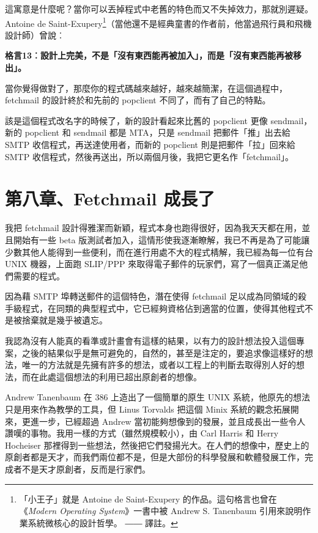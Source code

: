 \documentclass[12pt, a5paper]{book}
\begin{document}
這寓意是什麼呢？當你可以丟掉程式中老舊的特色而又不失掉效力，那就別遲疑。Antoine
de Saint-Exupery\footnote{「小王子」就是 Antoine de Saint-Exupery
  的作品。這句格言也曾在《\emph{Modern Operating System}》一書中被
  Andrew S. Tanenbaum 引用來說明作業系統微核心的設計哲學。 ―― 譯註。}（當他還不是經典童書的作者前，他當過飛行員和飛機設計師）曾說︰

\textbf{格言13︰設計上完美，不是「沒有東西能再被加入」，而是「沒有東西能再被移出」。}

當你覺得做對了，那麼你的程式碼越來越好，越來越簡潔，在這個過程中，fetchmail
的設計終於和先前的 popclient 不同了，而有了自己的特點。

該是這個程式改名字的時候了，新的設計看起來比舊的 popclient 更像
sendmail，新的 popclient 和 sendmail 都是 MTA，只是 sendmail
把郵件「推」出去給 SMTP 收信程式，再送達使用者，而新的 popclient
則是把郵件「拉」回來給 SMTP
收信程式，然後再送出，所以兩個月後，我把它更名作「fetchmail」。

\newpage
\section{第八章、Fetchmail
成長了}\label{ux7b2cux516bux7ae0fetchmail-ux6210ux9577ux4e86}

我把 fetchmail
設計得雅潔而新穎，程式本身也跑得很好，因為我天天都在用，並且開始有一些
beta
版測試者加入，這情形使我逐漸瞭解，我已不再是為了可能讓少數其他人能得到一些便利，而在進行用處不大的程式棈解，我已經為每一位有台
UNIX 機器，上面跑 SLIP/PPP
來取得電子郵件的玩家們，寫了一個真正滿足他們需要的程式。

因為藉 SMTP 埠轉送郵件的這個特色，潛在使得 fetchmail
足以成為同領域的殺手級程式，在同類的典型程式中，它已經夠資格佔到適當的位置，使得其他程式不是被捨棄就是幾乎被遺忘。

我認為沒有人能真的看準或計畫會有這樣的結果，以有力的設計想法投入這個專案，之後的結果似乎是無可避免的，自然的，甚至是注定的，要追求像這樣好的想法，唯一的方法就是先擁有許多的想法，或者以工程上的判斷去取得別人好的想法，而在此處這個想法的利用已超出原創者的想像。

Andrew Tanenbaum 在 386 上造出了一個簡單的原生 UNIX
系統，他原先的想法只是用來作為教學的工具，但 Linus Torvalds 把這個 Minix
系統的觀念拓展開來，更進一步，已經超過 Andrew
當初能夠想像到的發展，並且成長出一些令人讚嘆的事物。我用一樣的方式（雖然規模較小），由
Carl Harris 和 Herry Hocheiser
那裡得到一些想法，然後把它們發揚光大。在人們的想像中，歷史上的原創者都是天才，而我們兩位都不是，但是大部份的科學發展和軟體發展工作，完成者不是天才原創者，反而是行家們。
\end{document}
